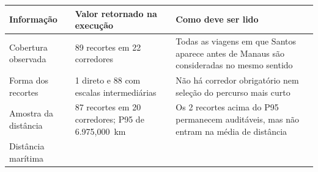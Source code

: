 \documentclass[brazil,]{article}
\begin{document}
\begin{longtable}[]{@{}lll@{}}
\toprule
\begin{minipage}[b]{0.30\columnwidth}\raggedright
Informação\strut
\end{minipage} & \begin{minipage}[b]{0.30\columnwidth}\raggedright
Valor retornado na execução\strut
\end{minipage} & \begin{minipage}[b]{0.30\columnwidth}\raggedright
Como deve ser lido\strut
\end{minipage}\tabularnewline
\midrule
\endhead
\begin{minipage}[t]{0.30\columnwidth}\raggedright
Cobertura observada\strut
\end{minipage} & \begin{minipage}[t]{0.30\columnwidth}\raggedright
89 recortes em 22 corredores\strut
\end{minipage} & \begin{minipage}[t]{0.30\columnwidth}\raggedright
Todas as viagens em que Santos aparece antes de Manaus são consideradas
no mesmo sentido\strut
\end{minipage}\tabularnewline
\begin{minipage}[t]{0.30\columnwidth}\raggedright
Forma dos recortes\strut
\end{minipage} & \begin{minipage}[t]{0.30\columnwidth}\raggedright
1 direto e 88 com escalas intermediárias\strut
\end{minipage} & \begin{minipage}[t]{0.30\columnwidth}\raggedright
Não há corredor obrigatório nem seleção do percurso mais curto\strut
\end{minipage}\tabularnewline
\begin{minipage}[t]{0.30\columnwidth}\raggedright
Amostra da distância\strut
\end{minipage} & \begin{minipage}[t]{0.30\columnwidth}\raggedright
87 recortes em 20 corredores; P95 de 6.975,000~km\strut
\end{minipage} & \begin{minipage}[t]{0.30\columnwidth}\raggedright
Os 2 recortes acima do P95 permanecem auditáveis, mas não entram na
média de distância\strut
\end{minipage}\tabularnewline
\begin{minipage}[t]{0.30\columnwidth}\raggedright
Distância marítima\strut
\end{minipage} & \begin{minipage}[t]{0.30\columnwidth}\raggedright

\end{minipage}
\end{longtable}
\end{document}
